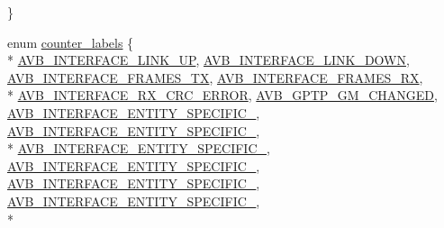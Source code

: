 \begin{DoxyCompactItemize}
 \}
\item 
enum \hyperlink{namespaceavdecc__lib_a831be56dba8ac423258a9374a1202df4}{counter\+\_\+labels} \{ \\*
\hyperlink{namespaceavdecc__lib_a831be56dba8ac423258a9374a1202df4ace6e5d91922a5894bb43065219ae3e5d}{A\+V\+B\+\_\+\+I\+N\+T\+E\+R\+F\+A\+C\+E\+\_\+\+L\+I\+N\+K\+\_\+\+UP}, 
\hyperlink{namespaceavdecc__lib_a831be56dba8ac423258a9374a1202df4aa789342277252d530b88a3d6f0330ba1}{A\+V\+B\+\_\+\+I\+N\+T\+E\+R\+F\+A\+C\+E\+\_\+\+L\+I\+N\+K\+\_\+\+D\+O\+WN}, 
\hyperlink{namespaceavdecc__lib_a831be56dba8ac423258a9374a1202df4a1952a099e63d03a7dcb1d6e3b0ea50af}{A\+V\+B\+\_\+\+I\+N\+T\+E\+R\+F\+A\+C\+E\+\_\+\+F\+R\+A\+M\+E\+S\+\_\+\+TX}, 
\hyperlink{namespaceavdecc__lib_a831be56dba8ac423258a9374a1202df4a521047f1a79ce7b8ae4e00350d4ec081}{A\+V\+B\+\_\+\+I\+N\+T\+E\+R\+F\+A\+C\+E\+\_\+\+F\+R\+A\+M\+E\+S\+\_\+\+RX}, 
\\*
\hyperlink{namespaceavdecc__lib_a831be56dba8ac423258a9374a1202df4a605ffe6c6d52bf64afcd06550ecd1e96}{A\+V\+B\+\_\+\+I\+N\+T\+E\+R\+F\+A\+C\+E\+\_\+\+R\+X\+\_\+\+C\+R\+C\+\_\+\+E\+R\+R\+OR}, 
\hyperlink{namespaceavdecc__lib_a831be56dba8ac423258a9374a1202df4a0267d3d1b1c33c2f0e0b58de3ef3fb94}{A\+V\+B\+\_\+\+G\+P\+T\+P\+\_\+\+G\+M\+\_\+\+C\+H\+A\+N\+G\+ED}, 
\hyperlink{namespaceavdecc__lib_a831be56dba8ac423258a9374a1202df4a17d9257c93fbea636945c338b5097747}{A\+V\+B\+\_\+\+I\+N\+T\+E\+R\+F\+A\+C\+E\+\_\+\+E\+N\+T\+I\+T\+Y\+\_\+\+S\+P\+E\+C\+I\+F\+I\+C\+\_}, 
\hyperlink{namespaceavdecc__lib_a831be56dba8ac423258a9374a1202df4ae6b8d362db4024237a61fa98cdf4c774}{A\+V\+B\+\_\+\+I\+N\+T\+E\+R\+F\+A\+C\+E\+\_\+\+E\+N\+T\+I\+T\+Y\+\_\+\+S\+P\+E\+C\+I\+F\+I\+C\+\_}, 
\\*
\hyperlink{namespaceavdecc__lib_a831be56dba8ac423258a9374a1202df4a0aea0a67ee79c7988f4f71f580d7a6aa}{A\+V\+B\+\_\+\+I\+N\+T\+E\+R\+F\+A\+C\+E\+\_\+\+E\+N\+T\+I\+T\+Y\+\_\+\+S\+P\+E\+C\+I\+F\+I\+C\+\_}, 
\hyperlink{namespaceavdecc__lib_a831be56dba8ac423258a9374a1202df4afe177be48bad4bb43a4274aac2c82d31}{A\+V\+B\+\_\+\+I\+N\+T\+E\+R\+F\+A\+C\+E\+\_\+\+E\+N\+T\+I\+T\+Y\+\_\+\+S\+P\+E\+C\+I\+F\+I\+C\+\_}, 
\hyperlink{namespaceavdecc__lib_a831be56dba8ac423258a9374a1202df4a5a5d8005f1eb8a17fe9cfbfc6d64de87}{A\+V\+B\+\_\+\+I\+N\+T\+E\+R\+F\+A\+C\+E\+\_\+\+E\+N\+T\+I\+T\+Y\+\_\+\+S\+P\+E\+C\+I\+F\+I\+C\+\_}, 
\hyperlink{namespaceavdecc__lib_a831be56dba8ac423258a9374a1202df4a31372583d9045ab48cdd6d6168054d21}{A\+V\+B\+\_\+\+I\+N\+T\+E\+R\+F\+A\+C\+E\+\_\+\+E\+N\+T\+I\+T\+Y\+\_\+\+S\+P\+E\+C\+I\+F\+I\+C\+\_}, 
\\*

\end{DoxyCompactItemize}
